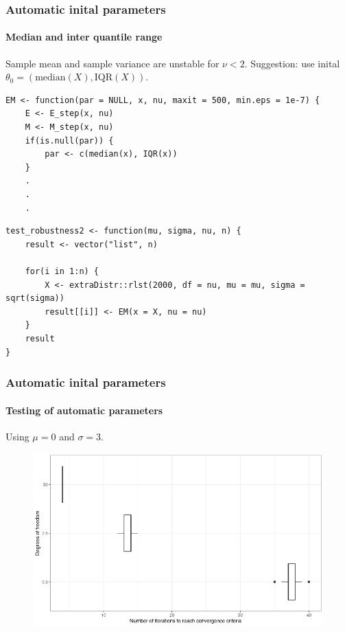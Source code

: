 \documentclass[aspectratio=169]{beamer}
\begin{document}
\begin{frame}[fragile]
    \frametitle{Automatic inital parameters}
    \framesubtitle{Median and inter quantile range}
    Sample mean and sample variance are unstable for $\nu < 2$. Suggestion: use inital $\theta_{0}=(\text{median}(X), \text{IQR}(X))$.
\begin{verbatim}
EM <- function(par = NULL, x, nu, maxit = 500, min.eps = 1e-7) {
    E <- E_step(x, nu)
    M <- M_step(x, nu) 
    if(is.null(par)) {
        par <- c(median(x), IQR(x))
    }
    .
    .
    .
\end{verbatim}
\begin{verbatim}
test_robustness2 <- function(mu, sigma, nu, n) {
    result <- vector("list", n)
    
    for(i in 1:n) {
        X <- extraDistr::rlst(2000, df = nu, mu = mu, sigma = sqrt(sigma))
        result[[i]] <- EM(x = X, nu = nu)
    }
    result
}
\end{verbatim}
\end{frame}
\begin{frame}
    \frametitle{Automatic inital parameters}
    \framesubtitle{Testing of automatic parameters} 
    Using $\mu = 0$ and $\sigma = 3$.
    \begin{figure}
        \centering
        \includegraphics[scale=0.4]{pictures/automatic.png}
    \end{figure}
\end{frame}
\end{document}
